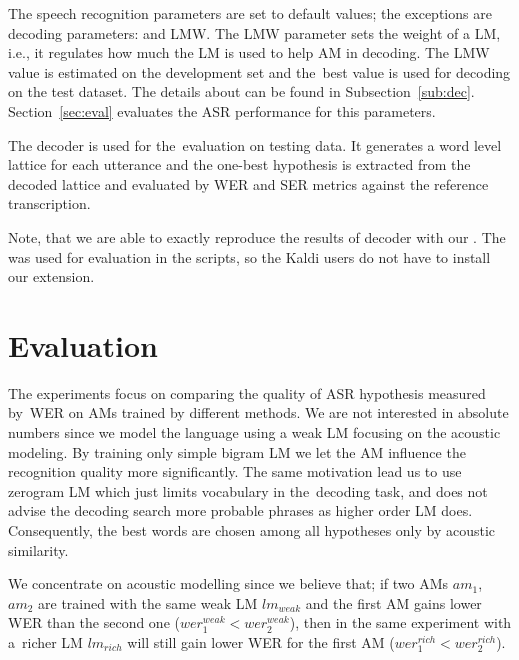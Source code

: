 The speech recognition parameters are set to default values; the exceptions are decoding parameters:  and \acl{LMW}. 
The \ac{LMW} parameter sets the weight of a \ac{LM}, i.e., it regulates how much the \ac{LM} is used to help \ac{AM} in decoding. 
The \ac{LMW} value is estimated on the development set and the~best value is used for decoding on the test dataset.
The details about  can be found in Subsection~\ref{sub:dec}.
Section~\ref{sec:eval} evaluates the \ac{ASR} performance for this parameters.

The  decoder is used for the~evaluation on testing data.
It generates a word level lattice for each utterance and the one-best hypothesis is extracted from the decoded lattice and evaluated by \ac{WER} and \ac{SER} metrics against the reference transcription.

Note, that we are able to exactly reproduce the results of  decoder with our .
The  was used for evaluation in the scripts, so the Kaldi users do not have to install our extension.

\section{Evaluation}
\label{sec:am_eval}

The experiments focus on comparing the quality of ASR hypothesis measured by~\ac{WER} on \acp{AM} trained by different methods.
We are not interested in absolute numbers since we model the language using a weak \ac{LM} focusing on the acoustic modeling.
By training only simple bigram \ac{LM} we let the \ac{AM} influence the recognition quality more significantly. 
The same motivation lead us to use zerogram \ac{LM} which just limits vocabulary in the~decoding task, and does not advise the decoding search more probable phrases as higher order \ac{LM} does.
Consequently, the best words are chosen among all hypotheses only by acoustic similarity.

We concentrate on acoustic modelling since we believe that; if two \acp{AM} $am_1$, $am_2$ are trained with the same weak \acl{LM} $lm_{weak}$ and the first \ac{AM} gains lower \ac{WER} than the second one ($wer^{weak}_{1} <  wer^{weak}_{2}$), then in the same experiment with a~richer \ac{LM} $lm_{rich}$ will still gain lower \ac{WER} for the first \ac{AM} ($wer^{rich}_{1} <  wer^{rich}_{2}$).

